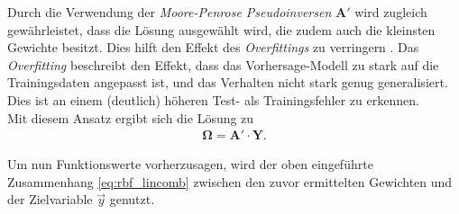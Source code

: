 Durch die Verwendung der \textit{Moore-Penrose Pseudoinversen} $\mathbf{A}'$ wird zugleich gewährleistet, dass die Lösung ausgewählt wird, die zudem auch die kleinsten Gewichte besitzt. Dies hilft den Effekt des \textit{Overfittings} zu verringern \cite{lowe2multi}. Das \textit{Overfitting} beschreibt den Effekt, dass das Vorhersage-Modell zu stark auf die Trainingsdaten angepasst ist, und das Verhalten nicht stark genug generalisiert. Dies ist an einem (deutlich) höheren Test- als Trainingsfehler zu erkennen.\\

Mit diesem Ansatz ergibt sich die Lösung zu
\begin{align}
\mathbf{\Omega} = \mathbf{A}' \cdot \mathbf{Y}.
\end{align}

Um nun Funktionswerte vorherzusagen, wird der oben eingeführte Zusammenhang \ref{eq:rbf_lincomb} zwischen den zuvor ermittelten Gewichten und der Zielvariable $\vec{y}$ genutzt.